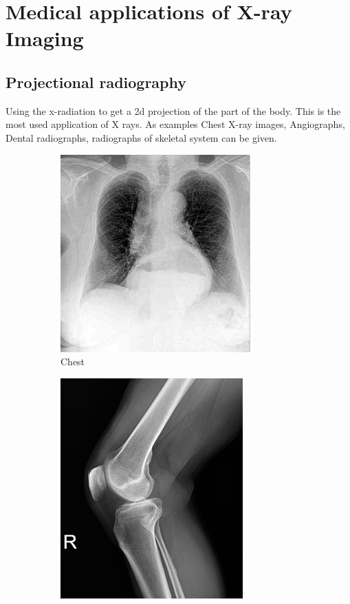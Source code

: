 \documentclass[12pt]{article}
\begin{document}
\pagebreak
\section{Medical applications of X-ray Imaging}
\subsection{Projectional radiography}
Using the x-radiation to get a 2d projection of the part of the body. This is the most used application of X rays. As examples Chest X-ray images, Angiographs, Dental radiographs, radiographs of skeletal system can be given. 
\begin{figure}[h!]
  \centering
  \begin{subfigure}[b]{0.5\linewidth}
    \centering
    \includegraphics[width=0.8\linewidth]{chest.jpg}
    \caption{Chest}
  \end{subfigure}
  \begin{subfigure}[b]{0.4\linewidth}
    \centering
    \includegraphics[width=0.855\linewidth]{knee.jpg}

\end{subfigure}
\end{figure}
\end{document}
